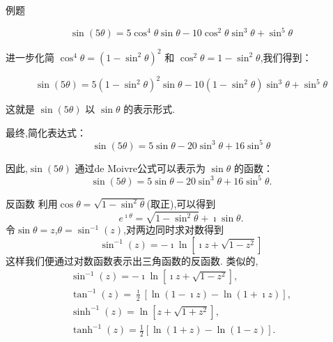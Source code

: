 \documentclass[fontset=windows, chinese, 10pt]{beamer}
\begin{document}
 \begin{frame}{例题}
  

 \begin{solution}
    \[
    \sin(5\theta) = 5\cos^4\theta \sin\theta - 10\cos^2\theta \sin^3\theta + \sin^5\theta
    \]

    进一步化简 $\cos^4\theta = (1 - \sin^2\theta)^2$ 和 $\cos^2\theta = 1 - \sin^2\theta$,我们得到：
    
    \[
    \sin(5\theta) = 5(1 - \sin^2\theta)^2\sin\theta - 10(1 - \sin^2\theta)\sin^3\theta + \sin^5\theta
    \]
    
    这就是 $\sin(5\theta)$ 以 $\sin\theta$ 的表示形式.
    
    最终,简化表达式：
    \[
    \sin(5\theta) = 5\sin\theta - 20\sin^3\theta + 16\sin^5\theta
    \]
    
    因此,$\sin(5\theta)$ 通过de Moivre公式可以表示为 $\sin\theta$ 的函数：
    \[
    \sin(5\theta) = 5\sin\theta - 20\sin^3\theta + 16\sin^5\theta.
    \]
\end{solution}
\end{frame}


\begin{frame}{反函数}
  利用$\cos \theta = \sqrt{1 - \sin ^2 \theta }$(取正),可以得到
\begin{equation}
  e^{\imath \theta} = \sqrt{ 1 - \sin ^2 \theta } + \imath \sin \theta .  
\end{equation} 
令$\sin \theta = z$,$\theta = \sin^{-1} (z)$,对两边同时求对数得到
\begin{equation}
    \sin^{-1} (z) = -\imath \ln \left[ \imath z + \sqrt{1-z^2} \right]
\end{equation}
这样我们便通过对数函数表示出三角函数的反函数.
类似的,
\begin{equation}
    \begin{array}{l}
    \sin ^{-1}(z) =-\imath\ln \left[\imath z+\sqrt{1-z^2}\right],  \\
     \tan ^{-1}(z) =\frac{\imath}{2}[\ln (1-\imath z)-\ln (1+\imath z)], \\
    \sinh ^{-1}(z) =\ln \left[z+\sqrt{1+z^2}\right], \\
     \tanh ^{-1}(z) =\frac{1}{2}[\ln (1+z)-\ln (1-z)] .
    \end{array}
\end{equation}
\end{frame}
\end{document}

